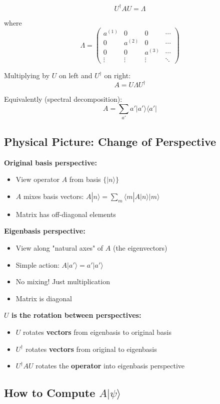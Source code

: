 \documentclass[11pt,a4paper]{article}
\begin{document}
$$\boxed{U^\dagger A U = \Lambda}$$

where
$$\Lambda = \begin{pmatrix}
a^{(1)} & 0 & 0 & \cdots \\
0 & a^{(2)} & 0 & \cdots \\
0 & 0 & a^{(3)} & \cdots \\
\vdots & \vdots & \vdots & \ddots
\end{pmatrix}$$

Multiplying by $U$ on left and $U^\dagger$ on right:
$$\boxed{A = U\Lambda U^\dagger}$$

Equivalently (spectral decomposition):
$$\boxed{A = \sum_{a'} a' |a'\rangle\langle a'|}$$

\subsection*{Physical Picture: Change of Perspective}

\textbf{Original basis perspective:}
\begin{itemize}
\item View operator $A$ from basis $\{|n\rangle\}$
\item $A$ mixes basis vectors: $A|n\rangle = \sum_m \langle m|A|n\rangle|m\rangle$
\item Matrix has off-diagonal elements
\end{itemize}

\textbf{Eigenbasis perspective:}
\begin{itemize}
\item View along "natural axes" of $A$ (the eigenvectors)
\item Simple action: $A|a'\rangle = a'|a'\rangle$
\item No mixing! Just multiplication
\item Matrix is diagonal
\end{itemize}

\textbf{$U$ is the rotation between perspectives:}
\begin{itemize}
\item $U$ rotates \textbf{vectors} from eigenbasis to original basis
\item $U^\dagger$ rotates \textbf{vectors} from original to eigenbasis
\item $U^\dagger A U$ rotates the \textbf{operator} into eigenbasis perspective
\end{itemize}

\subsection*{How to Compute $A|\psi\rangle$}
\end{document}
